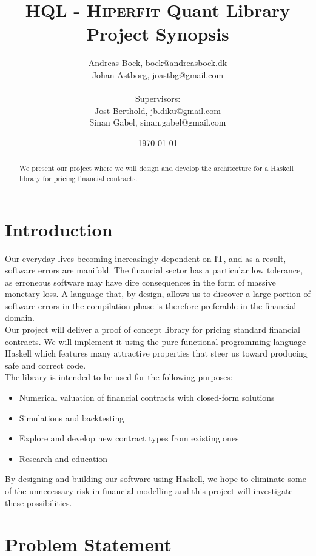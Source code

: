 \documentclass[11pt]{article}
\makeatletter
\def\Author{Andreas Bock, bock@andreasbock.dk\\
Johan Astborg, joastbg@gmail.com\\\\
Supervisors:\\
Jost Berthold, jb.diku@gmail.com\\
Sinan Gabel, sinan.gabel@gmail.com
}
\def\Title{\bf HQL - \textsc{Hiperfit} Quant Library\\ {\Large Project Synopsis}}
\makeatother
\begin{document}
\title{\Title}
\author{\Author}
\date{\today}
\maketitle

\begin{abstract}

We present our project where we will design and develop the architecture
for a Haskell library for pricing financial contracts.

\end{abstract}

\section*{Introduction}

Our everyday lives becoming increasingly dependent on IT, and as a result, software
errors are manifold. The financial sector has a particular low tolerance, as erroneous
software may have dire consequences in the form of massive monetary loss. A language
that, by design, allows us to discover a large portion of software errors in 
the compilation phase is therefore preferable in the financial domain.\\

Our project will deliver a proof of concept library for pricing standard financial contracts.
We will implement it using the pure functional programming language Haskell which features
many attractive properties that steer us toward producing safe and correct code.\\

The library is intended to be used for the following purposes:

\begin{itemize}
\item Numerical valuation of financial contracts with closed-form solutions
\item Simulations and backtesting
\item Explore and develop new contract types from existing ones
\item Research and education
\end{itemize}

By designing and building our software using Haskell, we hope to eliminate some
of the unnecessary risk in financial modelling and this project will investigate these possibilities.\\

\section*{Problem Statement}
\end{document}
